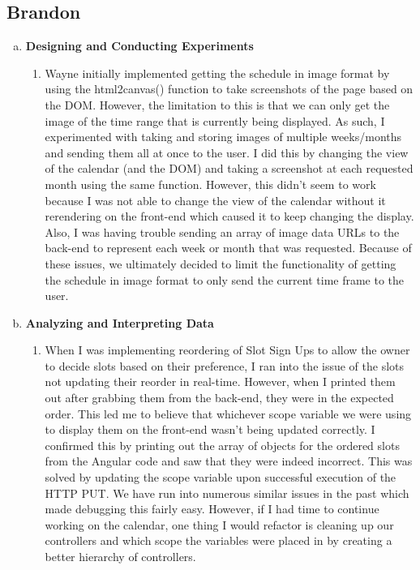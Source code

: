 \documentclass[11pt]{article}   %
\begin{document}
\subsection*{Brandon}

\begin{enumerate} [a)]
\item  {\bf Designing and Conducting Experiments}
\begin{enumerate} [$\cdot$]
\item Wayne initially implemented getting the schedule in image format by using the html2canvas() function to take screenshots of the page based on the DOM. However, the limitation to this is that we can only get the image of the time range that is currently being displayed. As such, I experimented with taking and storing images of multiple weeks/months and sending them all at once to the user. I did this by changing the view of the calendar (and the DOM) and taking a screenshot at each requested month using the same function. However, this didn't seem to work because I was not able to change the view of the calendar without it rerendering on the front-end which caused it to keep changing the display. Also, I was having trouble sending an array of image data URLs to the back-end to represent each week or month that was requested. Because of these issues, we ultimately decided to limit the functionality of getting the schedule in image format to only send the current time frame to the user.
\end{enumerate}
\item  {\bf Analyzing and Interpreting Data}
\begin{enumerate} [$\cdot$]
\item When I was implementing reordering of Slot Sign Ups to allow the owner to decide slots based on their preference, I ran into the issue of the slots not updating their reorder in real-time. However, when I printed them out after grabbing them from the back-end, they were in the expected order. This led me to believe that whichever scope variable we were using to display them on the front-end wasn't being updated correctly. I confirmed this by printing out the array of objects for the ordered slots from the Angular code and saw that they were indeed incorrect. This was solved by updating the scope variable upon successful execution of the HTTP PUT. We have run into numerous similar issues in the past which made debugging this fairly easy. However, if I had time to continue working on the calendar, one thing I would refactor is cleaning up our controllers and which scope the variables were placed in by creating a better hierarchy of controllers.

\end{enumerate}
\end{enumerate}
\end{document}

